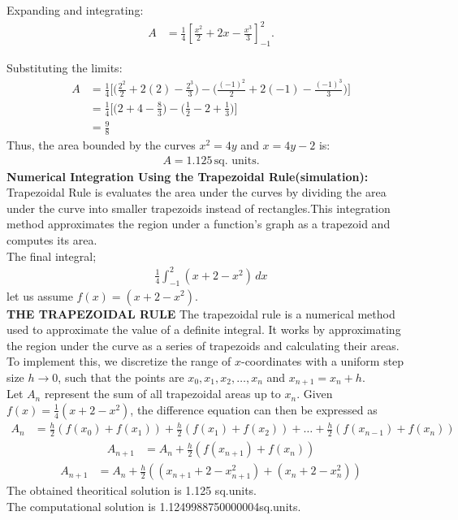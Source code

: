 \documentclass[journal]{IEEEtran}
\begin{document}
Expanding and integrating:
\begin{align}
A &= \frac{1}{4} \left[ \frac{x^2}{2} + 2x - \frac{x^3}{3} \right]_{-1}^2.
\end{align}

Substituting the limits:
\begin{align}
A &= \frac{1}{4} \bigg[ \bigg( \frac{2^2}{2} + 2(2) - \frac{2^3}{3} \bigg) - \bigg( \frac{(-1)^2}{2} + 2(-1) - \frac{(-1)^3}{3} \bigg) \bigg] \\
&= \frac{1}{4} \bigg[ \bigg( 2 + 4 - \frac{8}{3} \bigg) - \bigg( \frac{1}{2} - 2 + \frac{1}{3} \bigg) \bigg]\\
&=\frac{9}{8}
\end{align}
Thus, the area bounded by the curves $x^2 = 4y$ and $x = 4y - 2$ is:
\begin{align}
A = 1.125 \, \text{sq. units}.
\end{align}
\textbf{Numerical Integration Using the Trapezoidal Rule(simulation):}\\
Trapezoidal Rule is evaluates the area under the curves by dividing the area under the curve into smaller trapezoids instead of rectangles.This integration method approximates the region under a function's graph as a trapezoid and computes its area.\\
The final integral;
\begin{align}
{\frac{1}{4}}\int_{-1}^{2}( x+2-x^2)\, dx
\end{align}
let us assume $f(x)=(x+2-x^2)$.\\
\textbf{THE TRAPEZOIDAL RULE}
The trapezoidal rule is a numerical method used to approximate the value of a definite integral. It works by approximating the region under the curve as a series of trapezoids and calculating their areas. \\
To implement this, we discretize the range of $x$-coordinates with a uniform step size $h \to 0$, such that the points are $x_0, x_1, x_2, \dots, x_n$ and $x_{n+1} = x_n + h$. \\
Let $A_n$ represent the sum of all trapezoidal areas up to $x_n$. Given $f(x) =\frac{1}{4} {( x+2-x^2)}$, the difference equation can then be expressed as \\
\begin{align}
    A_n &= \frac{h}{2} \left( f(x_0) + f(x_1) \right) + \frac{h}{2} \left( f(x_1) + f(x_2) \right) + \dots + \frac{h}{2} \left( f(x_{n-1}) + f(x_n) \right)
\end{align}
\begin{align}
    A_{n+1} &= A_n + \frac{h}{2} \left( f(x_{n+1}) + f(x_n) \right)
\end{align}
\begin{align}
    A_{n+1} &= A_n + \frac{h}{2} \left( \left( x_{n+1} + 2 - x_{n+1}^2 \right) + \left( x_n + 2 - x_n^2 \right) \right)
\end{align}
The obtained theoritical solution is 1.125 sq.units.\\
The computational solution is 1.1249988750000004sq.units.
\end{document}
